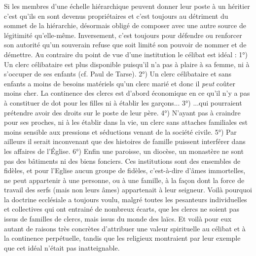  Si les membres d'une échelle hiérarchique peuvent donner leur poste à un héritier c'est qu'ils en sont devenus propriétaires et c'est toujours au détriment du sommet de la hiérarchie, désormais obligé de composer avec une autre source de légitimité qu'elle-même. Inversement, c'est toujours pour défendre ou renforcer son autorité qu'un souverain refuse que soit limité son pouvoir de nommer et de démettre.
 Au contraire du point de vue d'une institution le célibat est idéal : 1°) Un clerc célibataire est plus disponible puisqu'il n'a pas à plaire à sa femme, ni à s'occuper de ses enfants (cf. Paul de Tarse). 2°) Un clerc célibataire et sans enfants a moins de besoins matériels qu'un clerc marié et donc il \emph{peut} coûter moins cher. La continence des clercs est d'abord économique en ce qu'il n'y a pas à constituer de dot pour les filles ni à établir les garçons... 3°) ...qui pourraient prétendre avoir des droits sur le poste de leur père. 4°) N'ayant pas à craindre pour ses proches, ni à les établir dans la vie, un clerc sans attaches familiales est moins sensible aux pressions et séductions venant de la société civile. 5°) Par ailleurs il serait inconvenant que des histoires de famille puissent interférer dans les affaires de l'Église. 6°) Enfin une paroisse, un diocèse, un monastère ne sont pas des bâtiments ni des biens fonciers. Ces institutions sont des ensembles de fidèles, et pour l'Eglise aucun groupe de fidèles, c'est-à-dire d'âmes immortelles, ne peut appartenir à une personne, ou à une famille, à la façon dont la force de travail des serfs (mais non leurs âmes) appartenait à leur seigneur.
 Voilà pourquoi la doctrine ecclésiale a toujours voulu, malgré toutes les pesanteurs individuelles et collectives qui ont entrainé de nombreux écarts, que les clercs ne soient pas issus de familles de clercs, mais issus du monde des laïcs. Et voilà pour eux autant de raisons très concrètes d'attribuer une valeur spirituelle au célibat et à la continence perpétuelle, tandis que les religieux montraient par leur exemple que cet idéal n'était pas inatteignable. 

